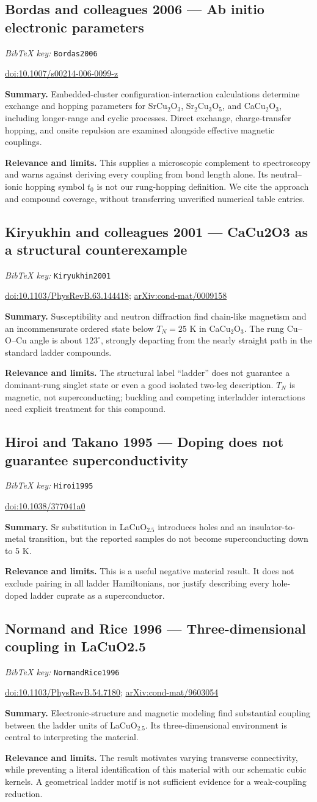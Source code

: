 \documentclass[11pt]{article}
\newcommand{\paper}[2]{\Needspace{8\baselineskip}\subsection{#2}\label{paper:#1}\textit{BibTeX key:} \texttt{#1}\quad\citep{#1}\par}
\newcommand{\doi}[1]{\href{https://doi.org/#1}{doi:#1}}
\newcommand{\arxiv}[1]{\href{https://arxiv.org/abs/#1}{arXiv:#1}}
\newcommand{\summary}{\par\textbf{Summary.} }
\newcommand{\relevance}{\par\textbf{Relevance and limits.} }
\begin{document}
\paper{Bordas2006}{Bordas and colleagues 2006 --- Ab initio electronic parameters}
\doi{10.1007/s00214-006-0099-z}
\summary Embedded-cluster configuration-interaction calculations determine exchange and hopping parameters for SrCu$_2$O$_3$, Sr$_2$Cu$_3$O$_5$, and CaCu$_2$O$_3$, including longer-range and cyclic processes. Direct exchange, charge-transfer hopping, and onsite repulsion are examined alongside effective magnetic couplings.
\relevance This supplies a microscopic complement to spectroscopy and warns against deriving every coupling from bond length alone. Its neutral--ionic hopping symbol $t_0$ is not our rung-hopping definition. We cite the approach and compound coverage, without transferring unverified numerical table entries.

\paper{Kiryukhin2001}{Kiryukhin and colleagues 2001 --- CaCu2O3 as a structural counterexample}
\doi{10.1103/PhysRevB.63.144418}; \arxiv{cond-mat/0009158}
\summary Susceptibility and neutron diffraction find chain-like magnetism and an incommensurate ordered state below $T_N=25$ K in CaCu$_2$O$_3$. The rung Cu--O--Cu angle is about $123^\circ$, strongly departing from the nearly straight path in the standard ladder compounds.
\relevance The structural label ``ladder'' does not guarantee a dominant-rung singlet state or even a good isolated two-leg description. $T_N$ is magnetic, not superconducting; buckling and competing interladder interactions need explicit treatment for this compound.

\paper{Hiroi1995}{Hiroi and Takano 1995 --- Doping does not guarantee superconductivity}
\doi{10.1038/377041a0}
\summary Sr substitution in LaCuO$_{2.5}$ introduces holes and an insulator-to-metal transition, but the reported samples do not become superconducting down to 5 K.
\relevance This is a useful negative material result. It does not exclude pairing in all ladder Hamiltonians, nor justify describing every hole-doped ladder cuprate as a superconductor.

\paper{NormandRice1996}{Normand and Rice 1996 --- Three-dimensional coupling in LaCuO2.5}
\doi{10.1103/PhysRevB.54.7180}; \arxiv{cond-mat/9603054}
\summary Electronic-structure and magnetic modeling find substantial coupling between the ladder units of LaCuO$_{2.5}$. Its three-dimensional environment is central to interpreting the material.
\relevance The result motivates varying transverse connectivity, while preventing a literal identification of this material with our schematic cubic kernels. A geometrical ladder motif is not sufficient evidence for a weak-coupling reduction.
\end{document}
